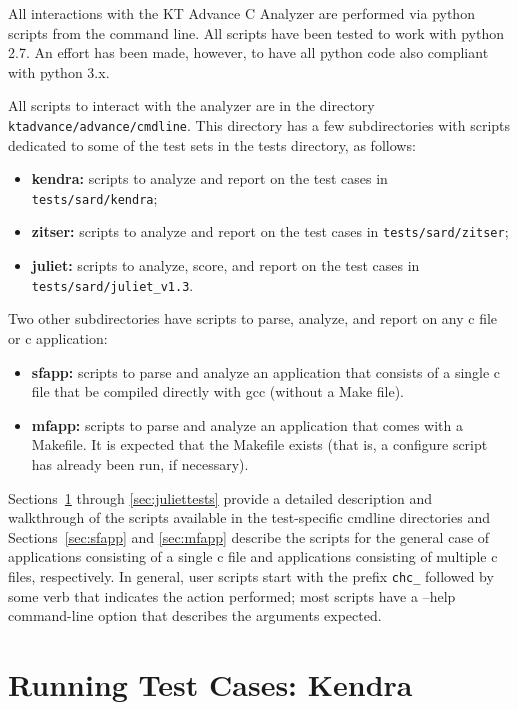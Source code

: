 \documentclass[11pt]{article}
\begin{document}
All interactions with the KT Advance C Analyzer are performed via python scripts from the
command line. All scripts have been tested to work with python 2.7. An effort has been
made, however, to have all python code also compliant with python 3.x.

All scripts to interact with the analyzer are in the directory 
{\tt ktadvance/advance/cmdline}. 
This directory has a few subdirectories with scripts dedicated to some of the test 
sets in the tests directory, as follows:
\begin{itemize}
\item {\bf kendra:} scripts to analyze and report on the test cases in 
 {\tt tests/sard/kendra};
\item {\bf zitser:} scripts to analyze and report on the test cases in
 {\tt tests/sard/zitser};
\item {\bf juliet:} scripts to analyze, score, and report on the test cases in
 {\tt tests/sard/juliet\_v1.3}.
\end{itemize}

Two other subdirectories have scripts to parse, analyze, and report on any c file or
c application:
\begin{itemize}
\item {\bf sfapp:} scripts to parse and analyze an application that consists of a single
  c file that be compiled directly with gcc (without a Make file). 
\item {\bf mfapp:} scripts to parse and analyze an application that comes with a Makefile.
  It is expected that the Makefile exists (that is, a configure script has already been
  run, if necessary).
\end{itemize}

Sections~\ref{sec:kendratests} through \ref{sec:juliettests} provide a detailed 
description and walkthrough of the scripts available in
the test-specific cmdline directories and Sections~\ref{sec:sfapp} and \ref{sec:mfapp}
describe the scripts
for the general case of applications consisting of a single c file and applications
consisting of multiple c files, respectively. In general, user scripts start with the 
prefix {\tt chc\_} followed by some verb that indicates the action performed; most 
scripts have a --help command-line
option that describes the arguments expected.

\section{Running Test Cases: Kendra}
\label{sec:kendratests}
\end{document}
